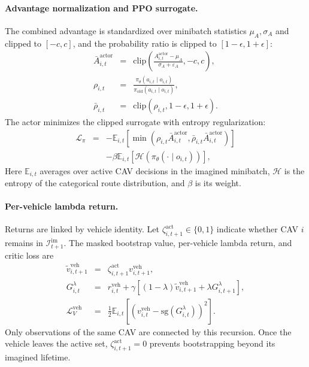 \paragraph{Advantage normalization and PPO surrogate.}  The combined
advantage is standardized over minibatch statistics \(\mu_A,\sigma_A\) and
clipped to \([-c,c]\), and the probability ratio is clipped to
\([1-\epsilon,1+\epsilon]\):
\begin{equation}
\begin{array}{rcl}
\bar A_{i,t}^{\mathrm{actor}}
&=&
\displaystyle
\mathrm{clip}\!\left(
\frac{A_{i,t}^{\mathrm{actor}}-\mu_A}{\sigma_A+\varepsilon_A},-c,c
\right),\\[0.35em]
\rho_{i,t}
&=&
\displaystyle
\frac{\pi_\theta(a_{i,t}\mid o_{i,t})}
{\pi_{\mathrm{old}}(a_{i,t}\mid o_{i,t})},\\[0.35em]
\bar\rho_{i,t}
&=&
\mathrm{clip}(\rho_{i,t},1-\epsilon,1+\epsilon).
\end{array}
\end{equation}
The actor minimizes the clipped surrogate with entropy regularization:
\begin{equation}
\begin{array}{rcl}
\mathcal{L}_{\pi}
&=&
-\mathbb{E}_{i,t}
\left[
\min\!\left(
\rho_{i,t}\bar A_{i,t}^{\mathrm{actor}},
\bar\rho_{i,t}\bar A_{i,t}^{\mathrm{actor}}
\right)
\right]\\
&&
-\beta\mathbb{E}_{i,t}
\left[\mathcal{H}(\pi_\theta(\cdot\mid o_{i,t}))\right],
\end{array}
\end{equation}
Here \(\mathbb{E}_{i,t}\) averages over active CAV decisions in the imagined
minibatch, \(\mathcal H\) is the entropy of the categorical route
distribution, and \(\beta\) is its weight.

\paragraph{Per-vehicle lambda return.}  Returns are linked by vehicle
identity.  Let \(\zeta_{i,t+1}^{\mathrm{act}}\in\{0,1\}\) indicate
whether CAV \(i\) remains in \(\mathcal{I}_{t+1}^{\mathrm{im}}\).  The
masked bootstrap value, per-vehicle lambda return, and critic loss are
\begin{equation}
\begin{array}{rcl}
\widetilde v_{i,t+1}^{\mathrm{veh}}
&=&
\zeta_{i,t+1}^{\mathrm{act}}v_{i,t+1}^{\mathrm{veh}},\\
G_{i,t}^{\lambda}
&=&
r_{i,t}^{\mathrm{veh}}
+\gamma\left[
(1-\lambda)\widetilde v_{i,t+1}^{\mathrm{veh}}
+\lambda G_{i,t+1}^{\lambda}
\right],\\[0.35em]
\mathcal{L}_{V}^{\mathrm{veh}}
&=&
\displaystyle
\frac{1}{2}\mathbb{E}_{i,t}
\left[
(v_{i,t}^{\mathrm{veh}}
-\mathrm{sg}(G_{i,t}^{\lambda}))^2
\right].
\end{array}
\end{equation}
Only observations of the same CAV are connected by this recursion.  Once the
vehicle leaves the active set, \(\zeta_{i,t+1}^{\mathrm{act}}=0\) prevents
bootstrapping beyond its imagined lifetime.


